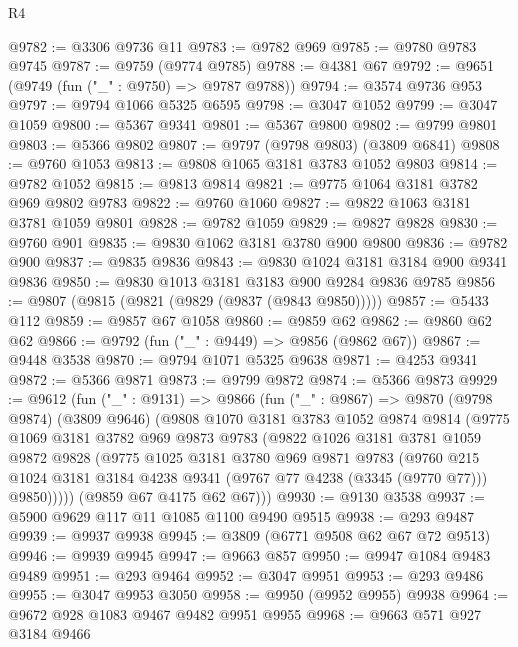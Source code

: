 \begin{lexlean}{R4}
\begin{coremodule}
@9782 := @3306 @9736 @11
@9783 := @9782 @969
@9785 := @9780 @9783 @9745
@9787 := @9759 (@9774 @9785)
@9788 := @4381 @67
@9792 := @9651 (@9749 (fun ("_" : @9750) => @9787 @9788))
@9794 := @3574 @9736 @953
@9797 := @9794 @1066 @5325 @6595
@9798 := @3047 @1052
@9799 := @3047 @1059
@9800 := @5367 @9341
@9801 := @5367 @9800
@9802 := @9799 @9801
@9803 := @5366 @9802
@9807 := @9797 (@9798 @9803) (@3809 @6841)
@9808 := @9760 @1053
@9813 := @9808 @1065 @3181 @3783 @1052 @9803
@9814 := @9782 @1052
@9815 := @9813 @9814
@9821 := @9775 @1064 @3181 @3782 @969 @9802 @9783
@9822 := @9760 @1060
@9827 := @9822 @1063 @3181 @3781 @1059 @9801
@9828 := @9782 @1059
@9829 := @9827 @9828
@9830 := @9760 @901
@9835 := @9830 @1062 @3181 @3780 @900 @9800
@9836 := @9782 @900
@9837 := @9835 @9836
@9843 := @9830 @1024 @3181 @3184 @900 @9341 @9836
@9850 := @9830 @1013 @3181 @3183 @900 @9284 @9836 @9785
@9856 := @9807 (@9815 (@9821 (@9829 (@9837 (@9843 @9850)))))
@9857 := @5433 @112
@9859 := @9857 @67 @1058
@9860 := @9859 @62
@9862 := @9860 @62 @62
@9866 := @9792 (fun ("_" : @9449) => @9856 (@9862 @67))
@9867 := @9448 @3538
@9870 := @9794 @1071 @5325 @9638
@9871 := @4253 @9341
@9872 := @5366 @9871
@9873 := @9799 @9872
@9874 := @5366 @9873
@9929 := @9612
    (fun ("_" : @9131) =>
    @9866
      (fun ("_" : @9867) =>
      @9870
        (@9798 @9874)
        (@3809 @9646)
        (@9808
          @1070
          @3181
          @3783
          @1052
          @9874
          @9814
          (@9775
            @1069
            @3181
            @3782
            @969
            @9873
            @9783
            (@9822
              @1026
              @3181
              @3781
              @1059
              @9872
              @9828
              (@9775
                @1025
                @3181
                @3780
                @969
                @9871
                @9783
                (@9760
                  @215
                  @1024
                  @3181
                  @3184
                  @4238
                  @9341
                  (@9767 @77 @4238 (@3345 (@9770 @77)))
                  @9850)))))
        (@9859 @67 @4175 @62 @67)))
@9930 := @9130 @3538
@9937 := @5900 @9629 @117 @11 @1085 @1100 @9490 @9515
@9938 := @293 @9487
@9939 := @9937 @9938
@9945 := @3809 (@6771 @9508 @62 @67 @72 @9513)
@9946 := @9939 @9945
@9947 := @9663 @857
@9950 := @9947 @1084 @9483 @9489
@9951 := @293 @9464
@9952 := @3047 @9951
@9953 := @293 @9486
@9955 := @3047 @9953 @3050
@9958 := @9950 (@9952 @9955) @9938
@9964 := @9672 @928 @1083 @9467 @9482 @9951 @9955
@9968 := @9663 @571 @927 @3184 @9466

\end{coremodule}
\end{lexlean}

